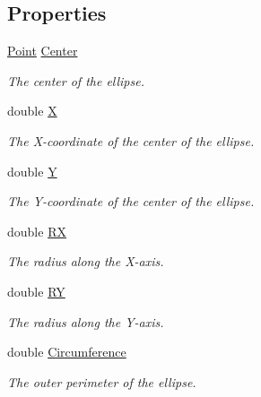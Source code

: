 \subsection*{Properties}
\begin{DoxyCompactItemize}
\item 
\mbox{\hyperlink{struct_s_g_l_1_1_point}{Point}} \mbox{\hyperlink{class_s_g_l_1_1_ellipse_a0f9ae80639bd70e68bed0513e8fe91bb}{Center}}
\begin{DoxyCompactList}\small\item\em The center of the ellipse. \end{DoxyCompactList}\item 
double \mbox{\hyperlink{class_s_g_l_1_1_ellipse_a79ef810cf7ed8d3911da64df3c846869}{X}}
\begin{DoxyCompactList}\small\item\em The X-\/coordinate of the center of the ellipse. \end{DoxyCompactList}\item 
double \mbox{\hyperlink{class_s_g_l_1_1_ellipse_a50e30bc042f57afbdf34924a0435fc21}{Y}}
\begin{DoxyCompactList}\small\item\em The Y-\/coordinate of the center of the ellipse. \end{DoxyCompactList}\item 
double \mbox{\hyperlink{class_s_g_l_1_1_ellipse_ac6630cfb928ba11742a1efefe7ed41ca}{RX}}
\begin{DoxyCompactList}\small\item\em The radius along the X-\/axis. \end{DoxyCompactList}\item 
double \mbox{\hyperlink{class_s_g_l_1_1_ellipse_af1df83b66e02fb6ebf969e608fc018d9}{RY}}
\begin{DoxyCompactList}\small\item\em The radius along the Y-\/axis. \end{DoxyCompactList}\item 
double \mbox{\hyperlink{class_s_g_l_1_1_ellipse_ac8c377f7d5e0efb4ca338e67fede6450}{Circumference}}
\begin{DoxyCompactList}\small\item\em The outer perimeter of the ellipse. \end{DoxyCompactList}\end{DoxyCompactItemize}


